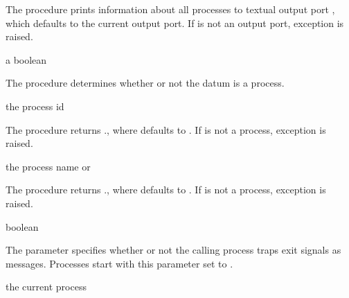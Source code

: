 The  procedure prints information about all processes to
textual output port , which defaults to the current output
port. If  is not an output port, exception  is raised.

\begin{procedure}
\end{procedure}
\returns{} a boolean

The  procedure determines whether or not the datum
 is a process.

\begin{procedure}
\end{procedure}
\returns{} the process id

The  procedure returns .,
where  defaults to . If  is not
a process, exception  is
raised.

\begin{procedure}
\end{procedure}
\returns{} the process name or 

The  procedure returns .,
where  defaults to . If  is not a
process, exception  is
raised.

\begin{parameter}
\end{parameter}
\hasvalue{} boolean

The  parameter specifies whether or not the
calling process traps exit signals as messages. Processes start with
this parameter set to .

\begin{syntax}
\end{syntax}
\returns{} the current process

